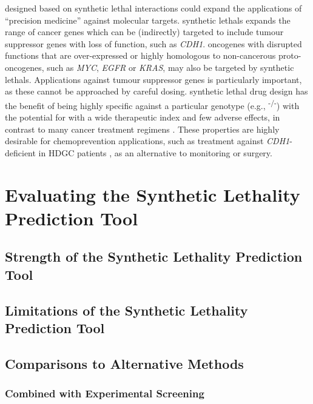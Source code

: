  designed based on \gls{synthetic lethal} interactions could expand the applications of ``precision medicine'' against molecular targets. %
\Glspl{synthetic lethal} expands the range of cancer genes which can be (indirectly) targeted to include \gls{tumour suppressor} genes with loss of function, such as \textit{CDH1}. \Glspl{oncogene} with disrupted functions that are over-expressed or highly homologous to non-cancerous proto-oncogenes, such as \textit{MYC}, \textit{EGFR} or \textit{KRAS}, may also be targeted by \glspl{synthetic lethal}. Applications against \gls{tumour suppressor} genes is particularly important, as these cannot be approached by careful dosing. \Gls{synthetic lethal} drug design has the benefit of being highly specific against a particular genotype (e.g., \textsuperscript{-/-}) with the potential for  with a wide therapeutic index and few adverse effects, in contrast to many cancer treatment regimens \citep{Hopkins2008, Kaelin2009}. These properties are highly desirable for \gls{chemoprevention} applications, such as treatment against \textit{CDH1}-deficient in \gls{HDGC} patients \citep{Guilford2010}, as an alternative to monitoring or surgery.

\iffalse
\section{Evaluating the Synthetic Lethality Prediction Tool}
\label{chapt6:slipt}


\subsection{Strength of the Synthetic Lethality Prediction Tool}
\label{chapt6:slipt_strengths}

\subsection{Limitations of the Synthetic Lethality Prediction Tool}
\label{chapt6:slipt_limitations}

\subsection{Comparisons to Alternative Methods}
\label{chapt6:slipt_compare}

\subsubsection{Combined with Experimental Screening}
\label{chapt6:slipt_compare_experimental}

